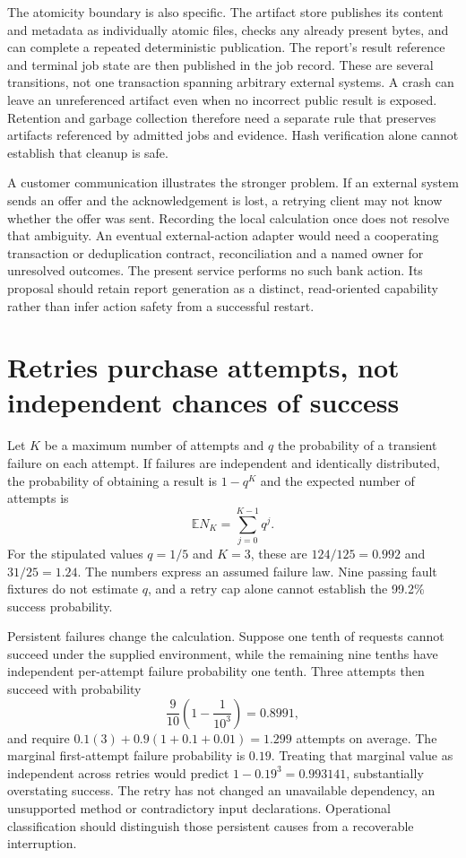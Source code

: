 The atomicity boundary is also specific. The artifact store publishes its
content and metadata as individually atomic files, checks any already
present bytes, and can complete a repeated deterministic publication. The
report's result reference and terminal job state are then published in the
job record. These are several transitions, not one transaction spanning
arbitrary external systems. A crash can leave an unreferenced artifact even
when no incorrect public result is exposed. Retention and garbage collection
therefore need a separate rule that preserves artifacts referenced by admitted
jobs and evidence. Hash verification alone cannot establish that cleanup is
safe.

A customer communication illustrates the stronger problem. If an external
system sends an offer and the acknowledgement is lost, a retrying client may
not know whether the offer was sent. Recording the local calculation once
does not resolve that ambiguity. An eventual external-action adapter would
need a cooperating transaction or deduplication contract, reconciliation and
a named owner for unresolved outcomes. The present service performs no such
bank action. Its proposal should retain report generation as a distinct,
read-oriented capability rather than infer action safety from a successful
restart.

\section{Retries purchase attempts, not independent chances of success}

Let $K$ be a maximum number of attempts and $q$ the probability of a transient
failure on each attempt. If failures are independent and identically
distributed, the probability of obtaining a result is $1-q^K$ and the
expected number of attempts is
\[
 \mathbb E N_K=\sum_{j=0}^{K-1}q^j.
\]
For the stipulated values $q=1/5$ and $K=3$, these are $124/125=0.992$
and $31/25=1.24$. The numbers express an assumed failure law. Nine passing
fault fixtures do not estimate $q$, and a retry cap alone cannot establish
the 99.2\% success probability\cite{exec13_ops_exact}.

Persistent failures change the calculation. Suppose one tenth of requests
cannot succeed under the supplied environment, while the remaining nine
tenths have independent per-attempt failure probability one tenth. Three
attempts then succeed with probability
\[
 \frac9{10}\left(1-\frac1{10^3}\right)=0.8991,
\]
and require $0.1(3)+0.9(1+0.1+0.01)=1.299$ attempts on average.
The marginal first-attempt failure probability is $0.19$. Treating that
marginal value as independent across retries would predict
$1-0.19^3=0.993141$, substantially overstating success. The retry has not
changed an unavailable dependency, an unsupported method or contradictory
input declarations. Operational classification should distinguish those
persistent causes from a recoverable interruption.

